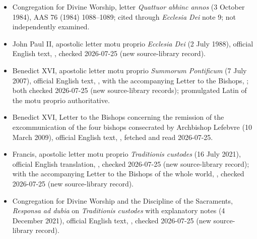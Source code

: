 {\fontsize{8.6}{9.6}\selectfont
\begin{itemize}[itemsep=0pt,parsep=0pt,topsep=0.05em]
\item Congregation for Divine Worship, letter \emph{Quattuor abhinc annos} (3 October 1984), AAS 76 (1984) 1088--1089; cited through \emph{Ecclesia Dei} note 9; not independently examined.
\item John Paul II, apostolic letter motu proprio \emph{Ecclesia Dei} (2 July 1988), official English text, , checked 2026-07-25 (new source-library record).
\item Benedict XVI, apostolic letter motu proprio \emph{Summorum Pontificum} (7 July 2007), official English text, , with the accompanying Letter to the Bishops, ; both checked 2026-07-25 (new source-library records); promulgated Latin of the motu proprio authoritative.
\item Benedict XVI, Letter to the Bishops concerning the remission of the excommunication of the four bishops consecrated by Archbishop Lefebvre (10 March 2009), official English text, , fetched and read 2026-07-25.
\item Francis, apostolic letter motu proprio \emph{Traditionis custodes} (16 July 2021), official English translation, , checked 2026-07-25 (new source-library record); with the accompanying Letter to the Bishops of the whole world, , checked 2026-07-25 (new source-library record).
\item Congregation for Divine Worship and the Discipline of the Sacraments, \emph{Responsa ad dubia} on \emph{Traditionis custodes} with explanatory notes (4 December 2021), official English text, , checked 2026-07-25 (new source-library record).

\end{itemize}}
